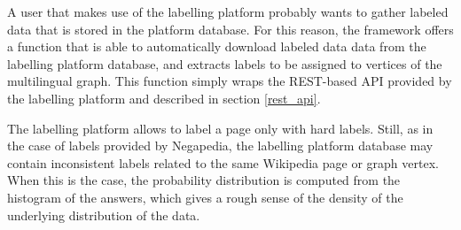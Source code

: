            A user that makes use of the labelling platform probably wants to gather labeled data that is stored in the platform database. For this reason, the framework offers a function that is able to automatically download labeled data data from the labelling platform database, and extracts labels to be assigned to vertices of the multilingual graph. This function simply wraps the REST-based API provided by the labelling platform and described in section \ref{rest_api}.
            
            The labelling platform allows to label a page only with hard labels. Still, as in the case of labels provided by Negapedia, the labelling platform database may contain inconsistent labels related to the same Wikipedia page or graph vertex. When this is the case, the probability distribution is computed from the histogram of the answers, which gives a rough sense of the density of the underlying distribution of the data.
            
